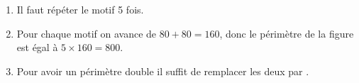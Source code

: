 
\medskip

\begin{enumerate}
\item Il faut répéter le motif 5 fois.
\item Pour chaque motif on avance de $80 + 80 = 160$, donc le périmètre de la figure est égal à $5 \times 160 = 800$.
\item Pour avoir un périmètre double il suffit de remplacer les deux  \fg{} par  \fg.
\end{enumerate}

\bigskip


